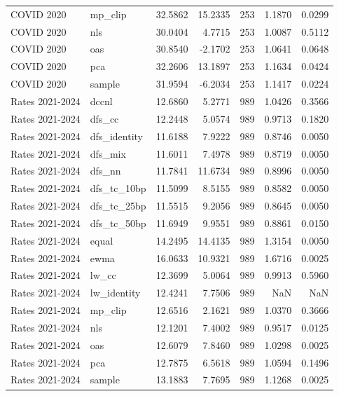 \begin{tabular}{llrrrrr}
COVID 2020 & mp_clip & 32.5862 & 15.2335 & 253 & 1.1870 & 0.0299 \\
COVID 2020 & nls & 30.0404 & 4.7715 & 253 & 1.0087 & 0.5112 \\
COVID 2020 & oas & 30.8540 & -2.1702 & 253 & 1.0641 & 0.0648 \\
COVID 2020 & pca & 32.2606 & 13.1897 & 253 & 1.1634 & 0.0424 \\
COVID 2020 & sample & 31.9594 & -6.2034 & 253 & 1.1417 & 0.0224 \\
Rates 2021-2024 & dccnl & 12.6860 & 5.2771 & 989 & 1.0426 & 0.3566 \\
Rates 2021-2024 & dfs_cc & 12.2448 & 5.0574 & 989 & 0.9713 & 0.1820 \\
Rates 2021-2024 & dfs_identity & 11.6188 & 7.9222 & 989 & 0.8746 & 0.0050 \\
Rates 2021-2024 & dfs_mix & 11.6011 & 7.4978 & 989 & 0.8719 & 0.0050 \\
Rates 2021-2024 & dfs_nn & 11.7841 & 11.6734 & 989 & 0.8996 & 0.0050 \\
Rates 2021-2024 & dfs_tc_10bp & 11.5099 & 8.5155 & 989 & 0.8582 & 0.0050 \\
Rates 2021-2024 & dfs_tc_25bp & 11.5515 & 9.2056 & 989 & 0.8645 & 0.0050 \\
Rates 2021-2024 & dfs_tc_50bp & 11.6949 & 9.9551 & 989 & 0.8861 & 0.0150 \\
Rates 2021-2024 & equal & 14.2495 & 14.4135 & 989 & 1.3154 & 0.0050 \\
Rates 2021-2024 & ewma & 16.0633 & 10.9321 & 989 & 1.6716 & 0.0025 \\
Rates 2021-2024 & lw_cc & 12.3699 & 5.0064 & 989 & 0.9913 & 0.5960 \\
Rates 2021-2024 & lw_identity & 12.4241 & 7.7506 & 989 & NaN & NaN \\
Rates 2021-2024 & mp_clip & 12.6516 & 2.1621 & 989 & 1.0370 & 0.3666 \\
Rates 2021-2024 & nls & 12.1201 & 7.4002 & 989 & 0.9517 & 0.0125 \\
Rates 2021-2024 & oas & 12.6079 & 7.8460 & 989 & 1.0298 & 0.0025 \\
Rates 2021-2024 & pca & 12.7875 & 6.5618 & 989 & 1.0594 & 0.1496 \\
Rates 2021-2024 & sample & 13.1883 & 7.7695 & 989 & 1.1268 & 0.0025 \\
\bottomrule
\end{tabular}
